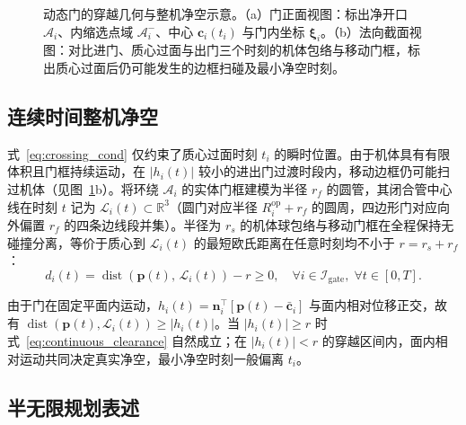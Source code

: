 \documentclass[journal]{IEEEtran}
\begin{document}
\begin{figure}[t]
\centering
{}
\caption{动态门的穿越几何与整机净空示意。（a）门正面视图：标出净开口 $\mathcal{A}_i$、内缩选点域 $\mathcal{A}_i^-$、中心 $\mathbf{c}_i(t_i)$ 与门内坐标 $\boldsymbol{\xi}_i$。（b）法向截面视图：对比进门、质心过面与出门三个时刻的机体包络与移动门框，标出质心过面后仍可能发生的边框扫碰及最小净空时刻。}
\label{fig:gate_geometry}
\end{figure}

\subsection{连续时间整机净空}

式~\eqref{eq:crossing_cond} 仅约束了质心过面时刻 $t_i$ 的瞬时位置。由于机体具有有限体积且门框持续运动，在 $|h_i(t)|$ 较小的进出门过渡时段内，移动边框仍可能扫过机体（见图~\ref{fig:gate_geometry}b）。将环绕 $\mathcal{A}_i$ 的实体门框建模为半径 $r_f$ 的圆管，其闭合管中心线在时刻 $t$ 记为 $\mathcal{L}_i(t) \subset \mathbb{R}^3$（圆门对应半径 $R_i^{\mathrm{op}} + r_f$ 的圆周，四边形门对应向外偏置 $r_f$ 的四条边线段并集）。半径为 $r_s$ 的机体球包络与移动门框在全程保持无碰撞分离，等价于质心到 $\mathcal{L}_i(t)$ 的最短欧氏距离在任意时刻均不小于 $r = r_s + r_f$：
\begin{equation}
d_i(t) = \operatorname{dist}\!\left(\mathbf{p}(t),\, \mathcal{L}_i(t)\right) - r \ge 0, \quad
\forall i \in \mathcal{I}_{\mathrm{gate}}, \; \forall t \in [0, T].
\label{eq:continuous_clearance}
\end{equation}

由于门在固定平面内运动，$h_i(t) = \mathbf{n}_i^\top[\mathbf{p}(t) - \bar{\mathbf{c}}_i]$ 与面内相对位移正交，故有 $\operatorname{dist}(\mathbf{p}(t), \mathcal{L}_i(t)) \ge |h_i(t)|$。当 $|h_i(t)| \ge r$ 时式~\eqref{eq:continuous_clearance} 自然成立；在 $|h_i(t)| < r$ 的穿越区间内，面内相对运动共同决定真实净空，最小净空时刻一般偏离 $t_i$。

\subsection{半无限规划表述}
\end{document}
